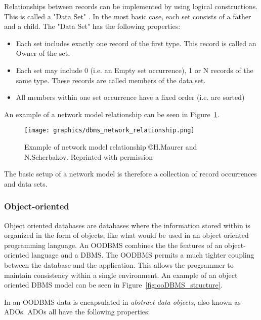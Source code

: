 \documentclass[letterpaper, 11pt]{article}
\begin{document}
Relationships between records can be implemented by using logical constructions.
This is called a "Data Set" . In the most basic case, each set consists of a father
and a child. The "Data Set" has the following properties:
\begin{itemize}
  \item Each set includes exactly one record of the first type. This record is called an Owner of the set.
  \item Each set may include 0 (i.e. an Empty set occurrence), 1 or N records of the same type. These records are called members of the data set.
  \item All members within one set occurrence have a fixed order (i.e. are sorted)
\end{itemize}
An example of a network model relationship can be seen in Figure~\ref{fig:networkDBMS_relationship}.
\par\vspace{\baselineskip}

\begin{figure}[H]
  \centering
  \texttt{[image: graphics/dbms\_network\_relationship.png]}
  \caption{Example of network model relationship \copyright H.Maurer \newline and N.Scherbakov. Reprinted with permission \cite{network_model_coronet}}
  \label{fig:networkDBMS_relationship}
\end{figure}

The basic setup of a network model is therefore a collection of record occurrences and
data sets.

\subsubsection{Object-oriented}
Object oriented databases are databases where the information stored within is organized
in the form of objects, like what would be used in an object oriented programming
language. An OODBMS combines the the features of an object-oriented language and a
DBMS. The OODBMS permits a much tighter coupling between the database and the application. 
This allows the programmer to maintain consistency within a single environment. An example 
of an object oriented DBMS model can be seen in Figure~\ref{fig:ooDBMS_structure}.

\par\vspace{\baselineskip}
In an OODBMS data is encapsulated in \textit{abstract data objects}, also known
as ADOs. ADOs all have the following properties:
\end{document}
